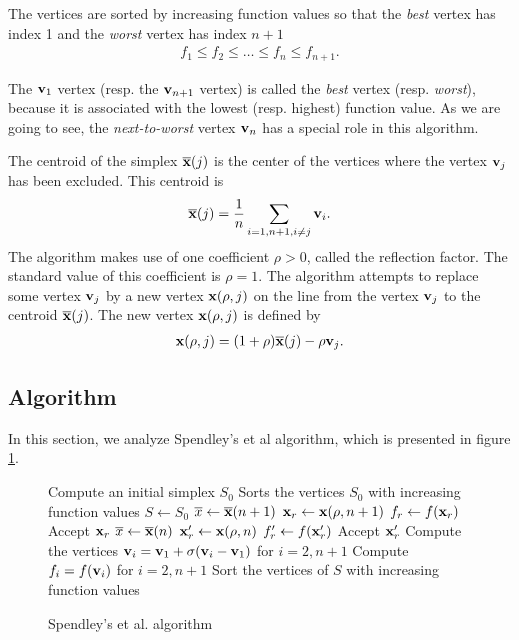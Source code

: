 The vertices are sorted by increasing function values so that the 
\emph{best} vertex has index 1 and the \emph{worst} vertex 
has index $n+1$
\begin{eqnarray}
\label{sp-sorted-vertices-fv}
f_1 \leq f_2 \leq \ldots \leq f_n \leq f_{n+1}.
\end{eqnarray}

The $\mathbf{v}_1$ vertex (resp. the $\mathbf{v}_{n+1}$ vertex) is called the \emph{best} 
vertex (resp. \emph{worst}), because it is associated with the lowest (resp. highest)
function value. As we are going to see, the \emph{next-to-worst} vertex $\mathbf{v}_n$ has a 
special role in this algorithm.

The centroid of the simplex $\overline{\mathbf{x}} (j)$ is the center of the vertices
where the vertex $\mathbf{v}_j$ has been 
excluded. This centroid is 
\begin{eqnarray}
\label{sp-centroid-generalized}
\overline{\mathbf{x}} (j) = \frac{1}{n} \sum_{i=1,n+1, i\neq j} \mathbf{v}_i.
\end{eqnarray}
The algorithm makes use
of one coefficient $\rho>0$, called the reflection factor. The standard
value of this coefficient is $\rho=1$.
The algorithm attempts to replace some vertex 
$\mathbf{v}_j$ by a new vertex $\mathbf{x}(\rho,j)$ on the line from the vertex $\mathbf{v}_j$
to the centroid  $\overline{\mathbf{x}}(j)$. The new vertex $\mathbf{x}(\rho,j)$ is defined by 
\begin{eqnarray}
\label{sp-interpolate-generalized}
\mathbf{x}(\rho,j) = (1+\rho)\overline{\mathbf{x}}(j) - \rho \mathbf{v}_j.
\end{eqnarray}

\subsection{Algorithm}

In this section, we analyze Spendley's et al algorithm, which
is presented in figure \ref{algo-spendley}.

\begin{figure}[htbp]
\begin{algorithmic}
\STATE Compute an initial simplex $S_0$
\STATE Sorts the vertices $S_0$ with increasing function values
\STATE $S\gets S_0$
  \STATE $\overline{x}\gets \overline{\mathbf{x}}(n+1)$ 
  \STATE $\mathbf{x}_r \gets \mathbf{x}(\rho,n+1)$ 
  \STATE $f_r \gets f(\mathbf{x}_r)$ 
    \STATE Accept $\mathbf{x}_r$
  \ELSE
    \STATE $\overline{x}\gets \overline{\mathbf{x}}(n)$ 
    \STATE $\mathbf{x}_r^\prime \gets \mathbf{x}(\rho,n)$ 
    \STATE $f_r^\prime \gets f(\mathbf{x}_r^\prime)$ 
      \STATE Accept $\mathbf{x}_r^\prime$
    \ELSE 
      \STATE Compute the vertices $\mathbf{v}_i=\mathbf{v}_1 + \sigma (\mathbf{v}_i - \mathbf{v}_1)$ for $i=2,n+1$ 
      \STATE Compute $f_i = f(\mathbf{v}_i)$ for $i=2,n+1$
    \ENDIF
  \ENDIF
  \STATE Sort the vertices of $S$ with increasing function values
\ENDWHILE
\end{algorithmic}
\caption{Spendley's et al. algorithm}
\label{algo-spendley}
\end{figure}

